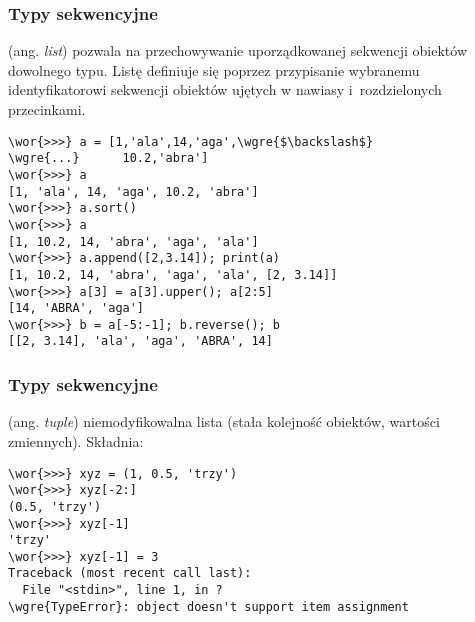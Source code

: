 \begin{frame}[fragile]
\frametitle{Typy sekwencyjne}

\begin{description}\small
 \item[\wor{lista}] (ang. \emph{list}) pozwala na przechowywanie
 uporządkowanej sekwencji obiektów dowolnego typu. Listę definiuje się
 poprzez przypisanie wybranemu identyfikatorowi sekwencji obiektów
 ujętych w nawiasy  i~rozdzielonych przecinkami.
\end{description}

\begin{Verbatim}[fontsize=\scriptsize,codes={\catcode`$=3\catcode`^=7},
                 frame=single,framesep=3mm,commandchars=\\\{\}]
\wor{>>>} a = [1,'ala',14,'aga',\wgre{$\backslash$}
\wgre{...}      10.2,'abra']
\wor{>>>} a
[1, 'ala', 14, 'aga', 10.2, 'abra']
\wor{>>>} a.sort()
\wor{>>>} a
[1, 10.2, 14, 'abra', 'aga', 'ala']
\wor{>>>} a.append([2,3.14]); print(a)
[1, 10.2, 14, 'abra', 'aga', 'ala', [2, 3.14]]
\wor{>>>} a[3] = a[3].upper(); a[2:5]
[14, 'ABRA', 'aga']
\wor{>>>} b = a[-5:-1]; b.reverse(); b
[[2, 3.14], 'ala', 'aga', 'ABRA', 14]
\end{Verbatim}
\end{frame}

\begin{frame}[fragile]
\frametitle{Typy sekwencyjne}

\begin{description}\small
 \item[\wor{krotka}] (ang. \emph{tuple}) niemodyfikowalna lista (stała
 kolejność obiektów, wartości zmiennych). Składnia:  
\end{description}
\begin{Verbatim}[fontsize=\scriptsize,codes={\catcode`$=3\catcode`^=7},
                 frame=single,framesep=3mm,commandchars=\\\{\}]
\wor{>>>} xyz = (1, 0.5, 'trzy')
\wor{>>>} xyz[-2:]
(0.5, 'trzy')
\wor{>>>} xyz[-1]
'trzy'
\wor{>>>} xyz[-1] = 3
Traceback (most recent call last):
  File "<stdin>", line 1, in ?
\wgre{TypeError}: object doesn't support item assignment
\end{Verbatim}
\end{frame}

